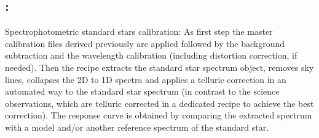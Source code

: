 \subsection{:}
Spectrophotometric standard stars calibration: As first step the master calibration files derived previously are applied followed by the background subtraction and 
the wavelength calibration (including distortion correction, if needed). Then the recipe extracts the standard star spectrum object, removes sky lines, collapses the 2D to 1D spectra and applies a telluric correction in an automated way to the standard star spectrum (in contrast to the science observations, which are telluric corrected in a dedicated recipe to achieve the best correction). The response curve is obtained by comparing the extracted spectrum with a model and/or another reference spectrum of the
standard star.
